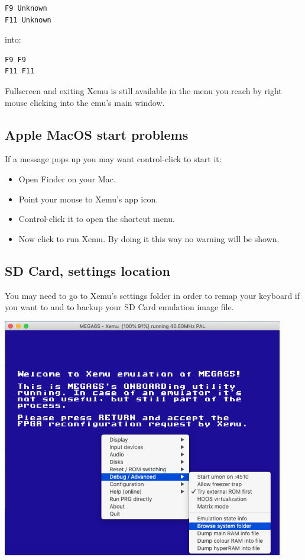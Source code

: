 \begin{tcolorbox}[colback=black,coltext=white]
\verbatimfont{\codefont}
\begin{verbatim}
F9 Unknown
F11 Unknown
\end{verbatim}
\end{tcolorbox}

into:

\begin{tcolorbox}[colback=black,coltext=white]
\verbatimfont{\codefont}
\begin{verbatim}
F9 F9
F11 F11
\end{verbatim}
\end{tcolorbox}

Fullscreen and exiting Xemu is still available in the menu you reach by right mouse
clicking into the emu's main window.

\subsection{Apple MacOS start problems}

If a message  pops up you
may want control-click to start it:  

\begin{itemize}
  \item Open Finder on your Mac.
  \item Point your mouse to Xemu's app icon.
  \item Control-click it to open the shortcut menu.
  \item Now click  to run Xemu. By doing it this way no warning will be shown.
\end{itemize}

\subsection{SD Card, settings location}
\label{sec:sdcard-settings-location}

You may need to go to Xemu's settings folder in order to remap your keyboard if you want
to and to backup your SD Card emulation image file.

\begin{center}
  \includegraphics[width=0.5\linewidth]{images/xemusettings.png}
\end{center}

